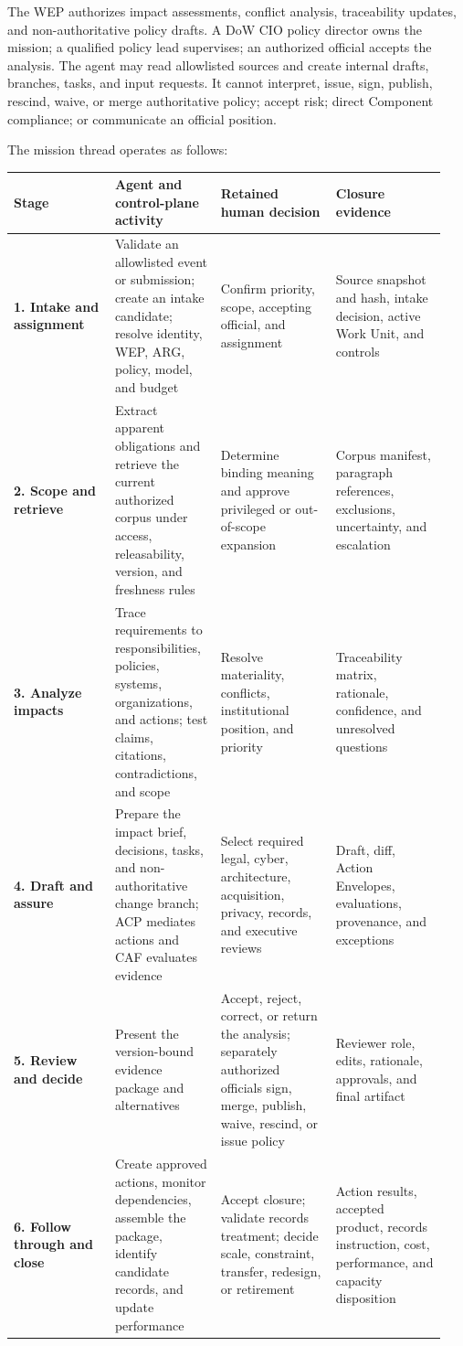 \documentclass[11pt]{article}
\begin{document}
The WEP authorizes impact assessments, conflict analysis, traceability
updates, and non-authoritative policy drafts. A DoW CIO policy director
owns the mission; a qualified policy lead supervises; an authorized
official accepts the analysis. The agent may read allowlisted sources
and create internal drafts, branches, tasks, and input requests. It
cannot interpret, issue, sign, publish, rescind, waive, or merge
authoritative policy; accept risk; direct Component compliance; or
communicate an official position.

The mission thread operates as follows:

\begingroup\scriptsize\setlength{\tabcolsep}{2pt}\begin{longtable}{p{0.22\linewidth}p{0.23\linewidth}p{0.25\linewidth}p{0.24\linewidth}}
\toprule\noalign{}
Stage & Agent and control-plane activity & Retained human decision &
Closure evidence \\
\midrule\noalign{}
\endhead
\bottomrule\noalign{}
\endlastfoot
\textbf{1. Intake and assignment} & Validate an allowlisted event or
submission; create an intake candidate; resolve identity, WEP, ARG,
policy, model, and budget & Confirm priority, scope, accepting official,
and assignment & Source snapshot and hash, intake decision, active Work
Unit, and controls \\
\textbf{2. Scope and retrieve} & Extract apparent obligations and
retrieve the current authorized corpus under access, releasability,
version, and freshness rules & Determine binding meaning and approve
privileged or out-of-scope expansion & Corpus manifest, paragraph
references, exclusions, uncertainty, and escalation \\
\textbf{3. Analyze impacts} & Trace requirements to responsibilities,
policies, systems, organizations, and actions; test claims, citations,
contradictions, and scope & Resolve materiality, conflicts,
institutional position, and priority & Traceability matrix, rationale,
confidence, and unresolved questions \\
\textbf{4. Draft and assure} & Prepare the impact brief, decisions,
tasks, and non-authoritative change branch; ACP mediates actions and CAF
evaluates evidence & Select required legal, cyber, architecture,
acquisition, privacy, records, and executive reviews & Draft, diff,
Action Envelopes, evaluations, provenance, and exceptions \\
\textbf{5. Review and decide} & Present the version-bound evidence
package and alternatives & Accept, reject, correct, or return the
analysis; separately authorized officials sign, merge, publish, waive,
rescind, or issue policy & Reviewer role, edits, rationale, approvals,
and final artifact \\
\textbf{6. Follow through and close} & Create approved actions, monitor
dependencies, assemble the package, identify candidate records, and
update performance & Accept closure; validate records treatment; decide
scale, constraint, transfer, redesign, or retirement & Action results,
accepted product, records instruction, cost, performance, and capacity
disposition \\
\end{longtable}\endgroup
\end{document}
